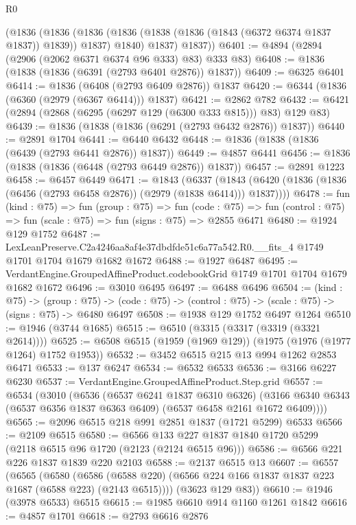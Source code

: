 \begin{lexlean}{R0}
\begin{coremodule}
      (@1836
        (@1836
          (@1836 (@1836 (@1838 (@1836 (@1843 (@6372 @6374 @1837 @1837)) @1839)) @1837) @1840)
          @1837)
        @1837))
@6401 := @4894 (@2894 (@2906 (@2062 @6371 @6374 @96 @333) @83) @333 @83)
@6408 := @1836 (@1838 (@1836 (@6391 (@2793 @6401 @2876)) @1837))
@6409 := @6325 @6401
@6414 := @1836 (@6408 (@2793 @6409 @2876)) @1837
@6420 := @6344 (@1836 (@6360 (@2979 (@6367 @6414))) @1837)
@6421 := @2862 @782
@6432 := @6421 (@2894 (@2868 (@6295 (@6297 @129 (@6300 @333 @815))) @83) @129 @83)
@6439 := @1836 (@1838 (@1836 (@6291 (@2793 @6432 @2876)) @1837))
@6440 := @2891 @1704
@6441 := @6440 @6432
@6448 := @1836 (@1838 (@1836 (@6439 (@2793 @6441 @2876)) @1837))
@6449 := @4857 @6441
@6456 := @1836 (@1838 (@1836 (@6448 (@2793 @6449 @2876)) @1837))
@6457 := @2891 @1223
@6458 := @6457 @6449
@6471 := @1843
    (@6337 (@1843 (@6420 (@1836 (@1836 (@6456 (@2793 @6458 @2876)) (@2979 (@1838 @6414))) @1837))))
@6478 := fun (kind : @75) =>
  fun (group : @75) =>
  fun (code : @75) => fun (control : @75) => fun (scale : @75) => fun (signs : @75) => @2855 @6471
@6480 := @1924 @129 @1752
@6487 := LexLeanPreserve.C2a4246aa8af4e37dbdfde51c6a77a542.R0.__fits_4
    @1749
    @1701
    @1704
    @1679
    @1682
    @1672
@6488 := @1927 @6487
@6495 := VerdantEngine.GroupedAffineProduct.codebookGrid @1749 @1701 @1704 @1679 @1682 @1672
@6496 := @3010 @6495
@6497 := @6488 @6496
@6504 := (kind : @75) ->
  (group : @75) -> (code : @75) -> (control : @75) -> (scale : @75) -> (signs : @75) -> @6480 @6497
@6508 := @1938 @129 @1752 @6497 @1264
@6510 := @1946 (@3744 @1685)
@6515 := @6510 (@3315 (@3317 (@3319 (@3321 @2614))))
@6525 := @6508 @6515 (@1959 (@1969 @129)) (@1975 (@1976 (@1977 @1264) @1752 @1953))
@6532 := @3452 @6515 @215 @13 @994 @1262 @2853 @6471
@6533 := @137 @6247
@6534 := @6532 @6533
@6536 := @3166 @6227 @6230
@6537 := VerdantEngine.GroupedAffineProduct.Step.grid
@6557 := @6534
    (@3010
      (@6536
        (@6537 @6241 @1837 @6310 @6326)
        (@3166 @6340 @6343 (@6537 @6356 @1837 @6363 @6409) (@6537 @6458 @2161 @1672 @6409))))
@6565 := @2096 @6515 @218 @991 @2851 @1837 (@1721 @5299) @6533
@6566 := @2109 @6515
@6580 := @6566 @133 @227 @1837 @1840 @1720 @5299 (@2118 @6515 @96 @1720 (@2123 (@2124 @6515 @96)))
@6586 := @6566 @221 @226 @1837 @1839 @220 @2103
@6588 := @2137 @6515 @13
@6607 := @6557
    (@6565
      (@6580
        (@6586 (@6588 @220) (@6566 @224 @166 @1837 @1837 @223 @1687 (@6588 @223) (@2143 @6515))))
      (@3623 @129 @83))
@6610 := @1946 (@3978 @6533) @6515
@6615 := @1985 @6610 @914 @1160 @1261 @1842
@6616 := @4857 @1701
@6618 := @2793 @6616 @2876

\end{coremodule}
\end{lexlean}

